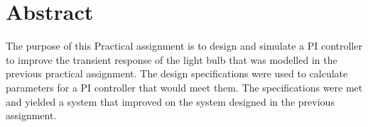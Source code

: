 

\begingroup
\let\clearpage\relax
\let\cleardoublepage\relax
\let\cleardoublepage\relax

\chapter*{Abstract} %

\label{ch:introduction} %

The purpose of this Practical assignment is to design and simulate a PI controller to improve the transient response of the light bulb that was modelled in the previous practical assignment. The design specifications were used to calculate parameters for a PI controller that would meet them. The specifications were met and yielded a system that improved on the system designed in the previous assignment.

\endgroup			

\vfill
